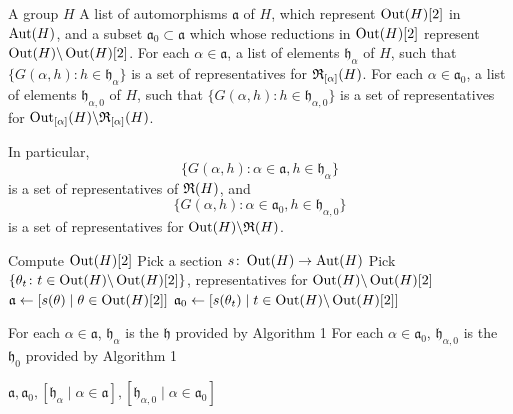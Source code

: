 \begin{algorithm}
\caption{Compute $\fR(H)$ and $\Out(H) \backslash \fR(H)$}
\begin{algorithmic}[1]

\Require A group $H$
\Ensure A list of automorphisms $\mathfrak{a}$ of $H$, which represent $\operatorname{Out}(H)[2]$ in $\operatorname{Aut}(H)$, and a subset $\mathfrak{a}_0 \subset \mathfrak{a}$ which whose reductions in $\operatorname{Out}(H)[2]$ represent $\operatorname{Out}(H) \backslash \operatorname{Out}(H)[2]$. For each $\alpha \in \mathfrak{a}$, a list of elements $\mathfrak{h}_{\alpha}$ of $H$, such that $\{G(\alpha, h) : h \in \mathfrak{h}_{\alpha}\}$ is a set of representatives for ${\mathfrak R}_{[\alpha]}(H)$. For each $\alpha \in \mathfrak{a}_0$, a list of elements $\mathfrak{h}_{\alpha, 0}$ of $H$, such that $\{G(\alpha, h) : h \in \mathfrak{h}_{\alpha, 0}\}$ is a set of representatives for $\operatorname{Out}_{[\alpha]}(H) \backslash {\mathfrak R}_{[\alpha]}(H)$.

In particular,
\[
\{G(\alpha, h) : \alpha \in \mathfrak{a}, h \in \mathfrak{h}_{\alpha}\}
\]
is a set of representatives of $\fR(H)$, and 
\[
\{G(\alpha, h) : \alpha \in \mathfrak{a}_0, h \in \mathfrak{h}_{\alpha,0}\}
\]
is a set of representatives for $\Out(H) \backslash \fR(H)$.

\State Compute $\operatorname{Out}(H)[2]$
\State Pick a section $s \colon \operatorname{Out}(H) \rightarrow \operatorname{Aut}(H)$
\State Pick $\{\theta_t \colon t \in \operatorname{Out}(H) \backslash \operatorname{Out}(H)[2]\}$, representatives for $\operatorname{Out}(H) \backslash \operatorname{Out}(H)[2]$
\State $\mathfrak{a} \leftarrow [s(\theta) \mid \theta \in \operatorname{Out}(H)[2]]$
\State $\mathfrak{a}_0 \leftarrow [s(\theta_t) \mid t \in \operatorname{Out}(H) \backslash \operatorname{Out}(H)[2]]$

\State For each $\alpha \in \mathfrak{a}$, $\mathfrak{h}_{\alpha}$ is the $\mathfrak{h}$ provided by Algorithm 1
\State For each $\alpha \in \mathfrak{a}_0$, $\mathfrak{h}_{\alpha, 0}$ is the $\mathfrak{h}_0$ provided by Algorithm 1

\Return $\mathfrak{a}, \mathfrak{a}_0, [\mathfrak{h}_{\alpha} \mid \alpha \in \mathfrak{a}], [\mathfrak{h}_{\alpha, 0} \mid \alpha \in \mathfrak{a}_0]$

\end{algorithmic}
\end{algorithm}
